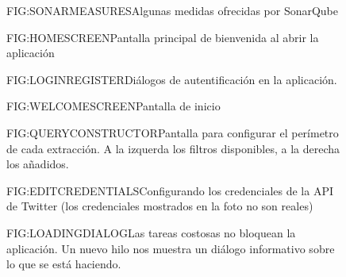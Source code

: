\begin{figure}[Medidas con SonarQube]{FIG:SONARMEASURES}{Algunas medidas ofrecidas por SonarQube}
	 \quad
	 \quad
\end{figure}

\begin{figure}[Pantalla inicial]{FIG:HOMESCREEN}{Pantalla principal de bienvenida al abrir la aplicación}
\end{figure}
\begin{figure}[Registro e inicio de sesión]{FIG:LOGINREGISTER}{Diálogos de autentificación en la aplicación.}
	 \quad
\end{figure}
\begin{figure}[Pantalla de bienvenida]{FIG:WELCOMESCREEN}{Pantalla de inicio}
\end{figure}
\begin{figure}[Constructor de consultas]{FIG:QUERYCONSTRUCTOR}{Pantalla para configurar el perímetro de cada extracción. A la izquerda los filtros disponibles, a la derecha los añadidos.}
\end{figure}
\begin{figure}[Edición de credenciales]{FIG:EDITCREDENTIALS}{Configurando los credenciales de la API de Twitter (los credenciales mostrados en la foto no son reales)}
\end{figure}
\begin{figure}[Tarea en segundo plano]{FIG:LOADINGDIALOG}{Las tareas costosas no bloquean la aplicación. Un nuevo hilo nos muestra un diálogo informativo sobre lo que se está haciendo.}
\end{figure}